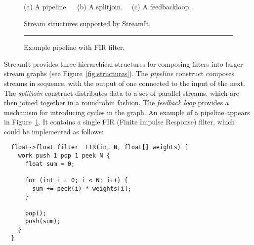 \documentclass[11pt, letterpaper, onecolumn]{article}
\begin{document}
\begin{figure}[t]
\vspace{-18pt}
\begin{singlespace}

~~
\begin{minipage}{0.46in}
{\centering
{} \\
}
\end{minipage} 
~
\begin{minipage}{1.3in}
{\centering
{} \\
}
\end{minipage}
~
\begin{minipage}{1.02in}
{\centering
{} \\
}
\end{minipage}
~~~~~~~~~
\begin{minipage}{3in}
\vspace{36pt}
~~~~
\end{minipage}
\\ ~ \\ {\protect\small (a) A pipeline. ~~(b) A splitjoin. ~~(c) A feedbackloop.}

\begin{minipage}{3.5in}
\caption{Stream structures supported by StreamIt.
\protect\label{fig:structures}}
\end{minipage}
\begin{minipage}{3in}
\caption{Example pipeline with FIR filter.\protect\label{fig:iir-pipeline}}
\end{minipage}
\vspace{3pt}
\hrule
\vspace{3pt}
\end{singlespace}
\vspace{-12pt}
\end{figure}

StreamIt provides three  hierarchical structures for composing filters
into larger stream graphs (see Figure~\ref{fig:structures}).  The {\it
pipeline} construct  composes streams in sequence, with  the output of
one connected to the input of the next.  The {\it splitjoin} construct
distributes data to  a set of parallel streams,  which are then joined
together in a roundrobin fashion.   The {\it feedback loop} provides a
mechanism  for introducing  cycles  in  the graph.   An  example of  a
pipeline  appears  in  Figure~\ref{fig:iir-pipeline}.  It  contains  a
single  FIR   (Finite  Impulse   Response)  filter,  which   could  be
implemented as follows:
\begin{verbatim}
  float->float filter  FIR(int N, float[] weights) {
    work push 1 pop 1 peek N {
      float sum = 0;

      for (int i = 0; i < N; i++) {
        sum += peek(i) * weights[i];
      }

      pop();
      push(sum);
    }
  }
\end{verbatim}
\end{document}
